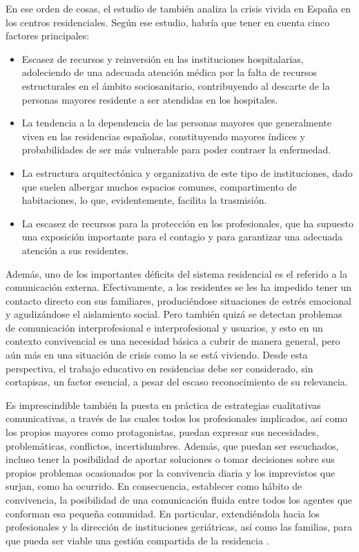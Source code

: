 \documentclass[spanish]{textolivre}
\begin{document}
En ese orden de cosas, el estudio de \textcite{deusalad2020} %
también analiza la crisis vivida en España en los centros residenciales. Según ese estudio, habría que tener en cuenta cinco factores principales:

\begin{itemize}
    \item Escasez de recursos y reinversión en las instituciones hospitalarias, adoleciendo de una adecuada atención médica por la falta de recursos estructurales en el ámbito sociosanitario, contribuyendo al descarte de la personas mayores residente a ser atendidas en los hospitales.
    \item La tendencia a la dependencia de las personas mayores que generalmente viven en las residencias españolas, constituyendo mayores índices y probabilidades de ser más vulnerable para poder contraer la enfermedad.
    \item La estructura arquitectónica y organizativa de este tipo de instituciones, dado que suelen albergar muchos espacios comunes, compartimento de habitaciones, lo que, evidentemente, facilita la trasmisión.
    \item La escasez de recursos para la protección en los profesionales, que ha supuesto una exposición importante para el contagio y para garantizar una adecuada atención a sus residentes.
\end{itemize}

Además, uno de los importantes déficits del sistema residencial es el referido a la comunicación externa. Efectivamente, a los residentes se les ha impedido tener un contacto directo con sus familiares, produciéndose situaciones de estrés emocional y agudizándose el aislamiento social. Pero también quizá se detectan problemas de comunicación interprofesional e interprofesional y usuarios, y esto en un contexto convivencial es una necesidad básica a cubrir de manera general, pero aún más en una situación de crisis como la se está viviendo. Desde esta perspectiva, el trabajo educativo en residencias debe ser considerado, sin cortapisas, un factor esencial, a pesar del escaso reconocimiento de su relevancia.

Es imprescindible también la puesta en práctica de estrategias cualitativas comunicativas, a través de las cuales todos los profesionales implicados, así como los propios mayores como protagonistas, puedan expresar sus necesidades, problemáticas, conflictos, incertidumbres. Además, que puedan ser escuchados, incluso tener la posibilidad de aportar soluciones o tomar decisiones sobre sus propios problemas ocasionados por la convivencia diaria y los imprevistos que surjan, como ha ocurrido. En consecuencia, establecer como hábito de convivencia, la posibilidad de una comunicación fluida entre todos los agentes que conforman esa pequeña comunidad. En particular, extendiéndola hacia los profesionales y la dirección de instituciones geriátricas, así como las familias, para que pueda ser viable una gestión compartida de la residencia \cite{martinezdemiguel2009}. %
\end{document}
